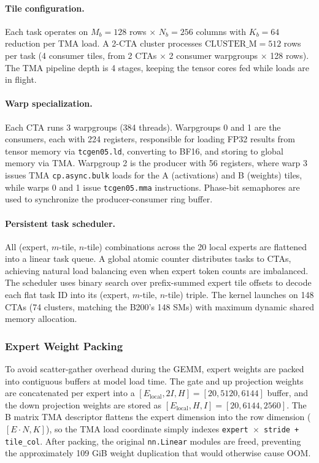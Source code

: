 \documentclass[sigplan,screen]{acmart}
\begin{document}
\paragraph{Tile configuration.} Each task operates on $M_b = 128$ rows $\times$ $N_b = 256$ columns with $K_b = 64$ reduction per TMA load. A 2-CTA cluster processes $\text{CLUSTER\_M} = 512$ rows per task (4 consumer tiles, from 2 CTAs $\times$ 2 consumer warpgroups $\times$ 128 rows). The TMA pipeline depth is 4 stages, keeping the tensor cores fed while loads are in flight.

\paragraph{Warp specialization.} Each CTA runs 3 warpgroups (384 threads). Warpgroups 0 and 1 are the consumers, each with 224 registers, responsible for loading FP32 results from tensor memory via \texttt{tcgen05.ld}, converting to BF16, and storing to global memory via TMA. Warpgroup 2 is the producer with 56 registers, where warp 3 issues TMA \texttt{cp.async.bulk} loads for the A (activations) and B (weights) tiles, while warps 0 and 1 issue \texttt{tcgen05.mma} instructions. Phase-bit semaphores are used to synchronize the producer-consumer ring buffer.

\paragraph{Persistent task scheduler.} All (expert, $m$-tile, $n$-tile) combinations across the 20 local experts are flattened into a linear task queue. A global atomic counter distributes tasks to CTAs, achieving natural load balancing even when expert token counts are imbalanced. The scheduler uses binary search over prefix-summed expert tile offsets to decode each flat task ID into its (expert, $m$-tile, $n$-tile) triple. The kernel launches on 148 CTAs (74 clusters, matching the B200's 148 SMs) with maximum dynamic shared memory allocation.

\subsubsection{Expert Weight Packing}

To avoid scatter-gather overhead during the GEMM, expert weights are packed into contiguous buffers at model load time. The gate and up projection weights are concatenated per expert into a $[E_{\text{local}}, 2I, H] = [20, 5120, 6144]$ buffer, and the down projection weights are stored as $[E_{\text{local}}, H, I] = [20, 6144, 2560]$. The B matrix TMA descriptor flattens the expert dimension into the row dimension ($[E \cdot N, K]$), so the TMA load coordinate simply indexes \texttt{expert $\times$ stride + tile\_col}. After packing, the original \texttt{nn.Linear} modules are freed, preventing the approximately 109 GiB weight duplication that would otherwise cause OOM.
\end{document}
